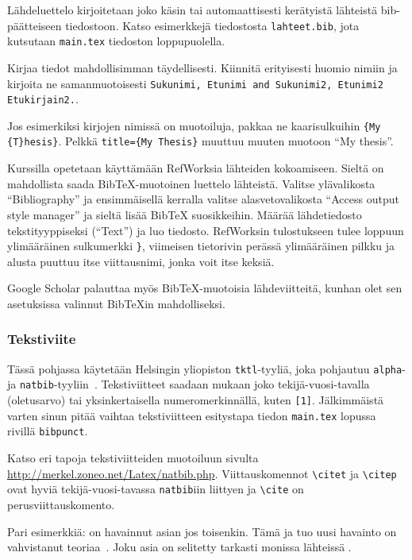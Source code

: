 Lähdeluettelo kirjoitetaan joko käsin tai automaattisesti
kerätyistä lähteistä bib-päät\-tei\-seen tiedostoon. Katso 
esimerkkejä tiedostosta \verb!lahteet.bib!, jota kutsutaan
\verb!main.tex! tiedoston loppupuolella. 

Kirjaa tiedot mahdollisimman täydellisesti. Kiinnitä erityisesti
huomio nimiin ja kirjoita ne samanmuotoisesti
\verb!Sukunimi, Etunimi and Sukunimi2, Etunimi2 Etukirjain2.!.

Jos esimerkiksi kirjojen nimissä on muotoiluja, pakkaa ne
kaarisulkuihin \verb!{My {T}hesis}!. 
Pelkkä \verb!title={My Thesis}! muuttuu muuten
muotoon ``My thesis''.

Kurssilla opetetaan käyttämään RefWorksia lähteiden kokoamiseen.
Sieltä on mahdollista saada BibTeX-muotoinen luettelo lähteistä.
Valitse ylävalikosta ``Bibliography'' ja ensimmäisellä kerralla
valitse alasvetovalikosta ``Access output style manager'' ja
sieltä lisää BibTeX suosikkeihin. Määrää lähdetiedosto tekstityyppiseksi
(``Text'') ja luo tiedosto. RefWorksin tulostukseen tulee loppuun
ylimääräinen sulkumerkki \verb!}!, viimeisen tietorivin perässä
ylimääräinen pilkku ja alusta puuttuu itse viittausnimi, jonka
voit itse keksiä.

Google Scholar palauttaa myös BibTeX-muotoisia lähdeviitteitä,
kunhan olet sen asetuksissa valinnut BibTeXin mahdolliseksi.

\subsubsection{Tekstiviite}
\label{sec:esimtekstiviite}

Tässä pohjassa käytetään Helsingin yliopiston 
\verb!tktl!-tyyliä, joka pohjautuu \verb!alpha!-
ja \verb!natbib!-tyyliin~\cite{tktl}.
Tekstiviitteet saadaan mukaan joko tekijä-vuosi-tavalla (oletusarvo)
tai yksinkertaisella numeromerkinnällä, kuten \verb![1]!. 
Jälkimmäistä varten sinun pitää vaihtaa tekstiviitteen esitystapa
tiedon \verb!main.tex! lopussa rivillä \verb!bibpunct!. 

\begin{sloppypar}
Katso eri tapoja tekstiviitteiden muotoiluun sivulta
\url{http://merkel.zoneo.net/Latex/natbib.php}.
Viittauskomennot  \verb!\citet! ja \verb!\citep! ovat
hyviä tekijä-vuosi-tavassa \verb!natbib!iin liittyen
ja \verb!\cite! on perusviittauskomento.
\end{sloppypar}

Pari esimerkkiä:
\citet[s. 21]{Teekkari2010} on havainnut asian jos toisenkin. 
Tämä ja tuo uusi havainto on vahvistanut teoriaa~\citep[s. 22]{Teekkari2010}.
Joku asia on selitetty tarkasti monissa lähteissä 
\citep[katso][s. 27]{Teekkari2010}.

